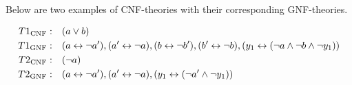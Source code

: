Below are two examples of CNF-theories with their corresponding GNF-theories.\\
\begin{example}
  \begin{align}
    T1_{\text{CNF}}:\quad& ( a \vee b )\\
    T1_{\text{GNF}}:\quad& ( a \leftrightarrow \neg a'), (a' \leftrightarrow \neg a), (b \leftrightarrow \neg b'), (b' \leftrightarrow \neg b), (y_1 \leftrightarrow (\neg a \wedge \neg b \wedge \neg y_1))\\
    T2_{\text{CNF}}:\quad& (\neg a)\\
    T2_{\text{GNF}}:\quad& ( a \leftrightarrow \neg a'), (a' \leftrightarrow \neg a), (y_1 \leftrightarrow (\neg a' \wedge \neg y_1))
  \end{align}
\end{example}
